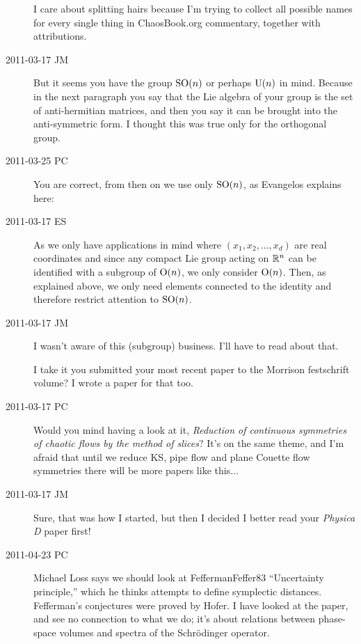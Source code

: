 \begin{description}
I care about splitting hairs because I'm trying to collect all possible
names for every single thing in ChaosBook.org commentary, together with
attributions.

\item[2011-03-17 JM]
But it seems you have the group $\textrm{SO}(n)$ or perhaps
$\textrm{U}(n)$ in mind. Because in the next paragraph
you say that the Lie algebra of your group is the set
of anti-hermitian matrices, and then you say it can be
brought into the anti-symmetric form. I thought this was
true only for the orthogonal group.

\item[2011-03-25 PC]
You are correct, from then on we use only  $\textrm{SO}(n)$, as Evangelos
explains here:

\item[2011-03-17 ES]
As we only have applications in mind where $(x_1,x_2,...,x_d)$ are real
coordinates and since any compact Lie group acting on $\mathbb{R}^n$ can be
identified with a subgroup of $\textrm{O}(n)$, we only consider $\textrm{O}(n)$. Then, as
explained above, we only need elements connected to the identity and
therefore restrict attention to $\textrm{SO}(n)$.

\item[2011-03-17 JM]
I wasn't aware of this (subgroup) business. I'll have to read about that.

I take it you submitted your most recent paper to the Morrison
festschrift volume? I wrote a paper for that too.

\item[2011-03-17 PC]
Would you mind having a look at it,
{\emph{Reduction of continuous symmetries}} \emph{of chaotic flows by the
method of slices}? It's on the same theme, and I'm afraid that until we
reduce KS, pipe flow and plane Couette flow symmetries there will be more
papers like this...

\item[2011-03-17 JM]
Sure, that was how I started, but then I decided I better read
your \emph{Physica D} paper first!

\item[2011-04-23 PC]
Michael Loss says we should look at Fefferman{Feffer83} ``Uncertainty
principle,'' which he thinks attempts to define symplectic distances.
Fefferman's conjectures were proved by Hofer. I have looked at the paper,
and see no connection to what we do; it's about relations between
phase-space volumes and spectra of the Schr\"odinger operator.

\end{description}


